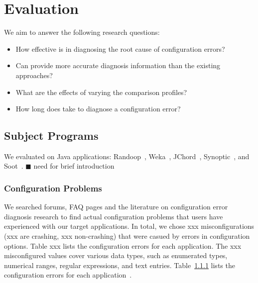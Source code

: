 \section{Evaluation}
\label{sec:evaluation}


We aim to answer the following research questions:

\begin{itemize}
\item How effective is \ourtool in diagnosing the root cause of
configuration errors?
\item Can \ourtool provide more accurate diagnosis information than
the existing approaches? 
\item What are the effects of varying the comparison profiles?
\item How long does \ourtool take to diagnose a configuration error?
\end{itemize}

\subsection{Subject Programs}

We evaluated \ourtool on \subjectnum Java applications: Randoop~\cite{randoop},
Weka~\cite{weka}, JChord~\cite{jchord}, Synoptic~\cite{synoptic},
and Soot~\cite{soot}. $\blacksquare$ need for brief introduction

\subsubsection{Configuration Problems}


We searched forums, FAQ pages and the literature on configuration error diagnosis
research to find actual configuration problems that users have experienced with our
target applications. In total, we chose xxx misconfigurations (xxx
are crashing, xxx non-crashing) that were casued by errors in
configuration options. Table xxx lists the configuration errors for each application.
The xxx misconfigured values cover various data types, such as enumerated types,
numerical ranges, regular expressions, and text entries. Table~\ref{} lists
the configuration errors for each application~\cite{tab:subjects}.

